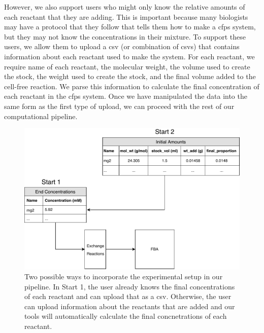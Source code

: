 However, we also support users who might only know the relative amounts of each reactant that they are adding.
This is important because many biologists may have a protocol that they follow that tells them how to make a \gls{cfps} system, but they may not know the concentrations in their mixture.
To support these users, we allow them to upload a \gls{csv} (or combination of \glspl{csv}) that contains information about each reactant used to make the system.
For each reactant, we require name of each reactant, the molecular weight, the volume used to create the stock, the weight used to create the stock, and the final volume added to the cell-free reaction.
We parse this information to calculate the final concentration of each reactant in the \gls{cfps} system.
Once we have manipulated the data into the same form as the first type of upload, we can proceed with the rest of our computational pipeline.

\begin{figure}[t!]
\begin{center}
\includegraphics{figs/DataIngestion.pdf}
\caption{Two possible ways to incorporate the experimental setup in our pipeline.
In Start 1, the user already knows the final concentrations of each reactant and can upload that as a \gls{csv}.
Otherwise, the user can upload information about the reactants that are added and our tools will automatically calculate the final concnetrations of each reactant.}
\end{center}
\label{fig:ingest}
\end{figure}

